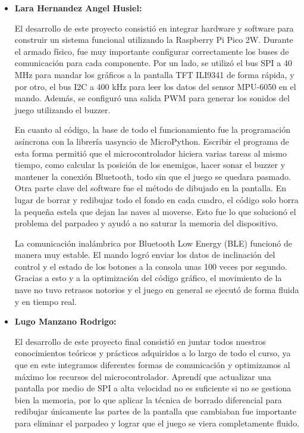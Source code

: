 \documentclass[letterpaper,12pt]{article}
\begin{document}
\begin{itemize}
        En conclusión, la construcción de este Galaga representó un reto . El proyecto me 
        permitió aplicar y reforzar conocimientos sobre programación de bajo nivel,
         manejo de protocolos de comunicación como SPI, I2C y BLE, 
         así como el manejo eficiente de los recursos del microcontrolador.

        \item \textbf{Lara Hernandez Angel Husiel:}
        
        El desarrollo de este proyecto consistió en integrar hardware y software para construir un sistema funcional utilizando la Raspberry Pi Pico 2W. Durante el armado físico, fue muy importante configurar correctamente los buses de comunicación para cada componente. Por un lado, se utilizó el bus SPI a 40 MHz para mandar los gráficos a la pantalla TFT ILI9341 de forma rápida, y por otro, el bus I2C a 400 kHz para leer los datos del sensor MPU-6050 en el mando. Además, se configuró una salida PWM para generar los sonidos del juego utilizando el buzzer.

        En cuanto al código, la base de todo el funcionamiento fue la programación asíncrona con la librería uasyncio de MicroPython. Escribir el programa de esta forma permitió que el microcontrolador hiciera varias tareas al mismo tiempo, como calcular la posición de los enemigos, hacer sonar el buzzer y mantener la conexión Bluetooth, todo sin que el juego se quedara pasmado. Otra parte clave del software fue el método de dibujado en la pantalla. En lugar de borrar y redibujar todo el fondo en cada cuadro, el código solo borra la pequeña estela que dejan las naves al moverse. Esto fue lo que solucionó el problema del parpadeo y ayudó a no saturar la memoria del dispositivo.

        La comunicación inalámbrica por Bluetooth Low Energy (BLE) funcionó de manera muy estable. El mando logró enviar los datos de inclinación del control y el estado de los botones a la consola unas 100 veces por segundo. Gracias a esto y a la optimización del código gráfico, el movimiento de la nave no tuvo retrasos notorios y el juego en general se ejecutó de forma fluida y en tiempo real.
        \item \textbf{Lugo Manzano Rodrigo:}
        
        El desarrollo de este proyecto final consistió en juntar todos nuestros conocimientos teóricos y prácticos adquiridos a lo largo de todo el curso, ya que en este integramos diferentes formas de comunicación y optimizamos al máximo los recursos del microcontrolador. Aprendí que actualizar una pantalla por medio de SPI a alta velocidad no es suficiente si no se gestiona bien la memoria, por lo que aplicar la técnica de borrado diferencial para redibujar únicamente las partes de la pantalla que cambiaban fue importante para eliminar el parpadeo y lograr que el juego se viera completamente fluido.


\end{itemize}
\end{document}

